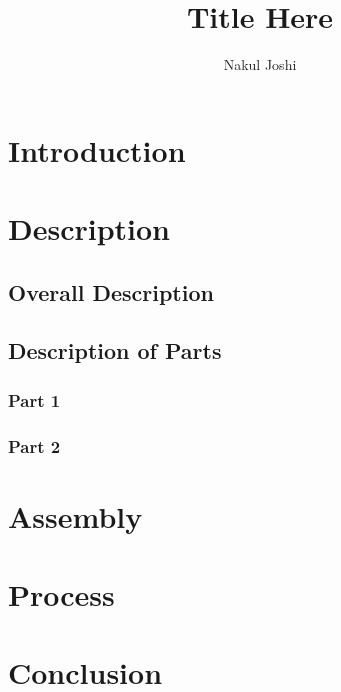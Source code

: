 \documentclass[titlepage]{article}
\title{Title Here}
\author{Nakul Joshi}
\date{}
\begin{document}
\maketitle
\tableofcontents
\newpage

\section{Introduction}

\section{Description}
	\subsection{Overall Description}
	\subsection{Description of Parts}
		\subsubsection{Part 1}
		\subsubsection{Part 2}	
	
\section{Assembly}
\section{Process}

\section{Conclusion}
\end{document}
